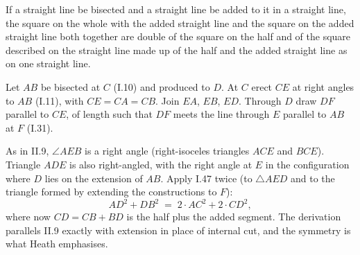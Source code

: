 \documentclass{rrxiv}
\begin{document}
\begin{claim}
\label{prop:II.10}
If a straight line be bisected and a straight line be added to it in
a straight line, the square on the whole with the added straight line
and the square on the added straight line both together are double of
the square on the half and of the square described on the straight
line made up of the half and the added straight line as on one
straight line.
\end{claim}
\begin{evidence}[Proof of II.10]
\label{ev:II.10}
Let $AB$ be bisected at $C$ (I.10) and produced to $D$.  At $C$ erect
$CE$ at right angles to $AB$ (I.11), with $CE = CA = CB$.  Join $EA$,
$EB$, $ED$.  Through $D$ draw $DF$ parallel to $CE$, of length such
that $DF$ meets the line through $E$ parallel to $AB$ at $F$ (I.31).

As in II.9, $\angle AEB$ is a right angle (right-isoceles triangles
$ACE$ and $BCE$).  Triangle $ADE$ is also right-angled, with the
right angle at $E$ in the configuration where $D$ lies on the
extension of $AB$.  Apply I.47 twice (to $\triangle AED$ and to the
triangle formed by extending the constructions to $F$):
\[
    AD^2 + DB^2 \;=\; 2\cdot AC^2 + 2\cdot CD^2,
\]
where now $CD = CB + BD$ is the half plus the added segment.  The
derivation parallels II.9 exactly with extension in place of internal
cut, and the symmetry is what Heath emphasises.
\end{evidence}
\end{document}
